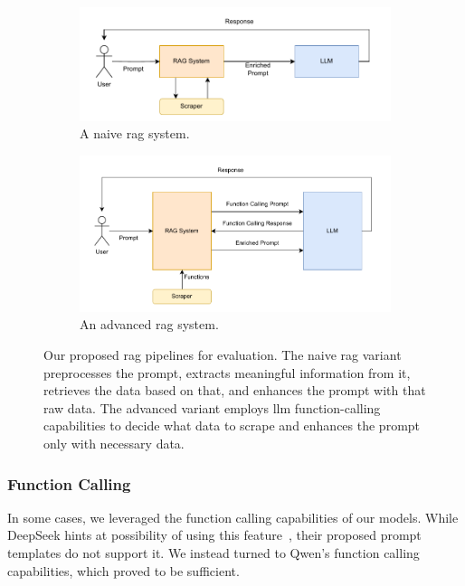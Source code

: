 \documentclass[fleqn,moreauthors,10pt]{ds_report}
\begin{document}
\begin{figure}
	\centering
	\begin{subfigure}{0.4\textwidth}
		\includegraphics[width=\textwidth]{./figures/simple_rag.pdf}
		\caption{A naive \ac{rag} system.}
	\end{subfigure}
	\hspace{20pt}
	\begin{subfigure}{0.4\textwidth}
		\includegraphics[width=\linewidth]{./figures/advanced_rag.pdf}
		\caption{An advanced \ac{rag} system.}
	\end{subfigure}
	\caption{Our proposed \ac{rag} pipelines for evaluation. The naive \ac{rag} variant preprocesses the prompt, extracts meaningful information from it, retrieves the data based on that, and enhances the prompt with that raw data. The advanced variant employs \ac{llm} function-calling capabilities to decide what data to scrape and enhances the prompt only with necessary data.}
	\label{fig:pipeline}
\end{figure}

\subsubsection*{Function Calling}

In some cases, we leveraged the function calling capabilities of our models. While DeepSeek hints at possibility of using this feature~\cite{deepseekFunctionCalling}, their proposed prompt templates do not support it. We instead turned to Qwen's function calling capabilities, which proved to be sufficient.
\end{document}
